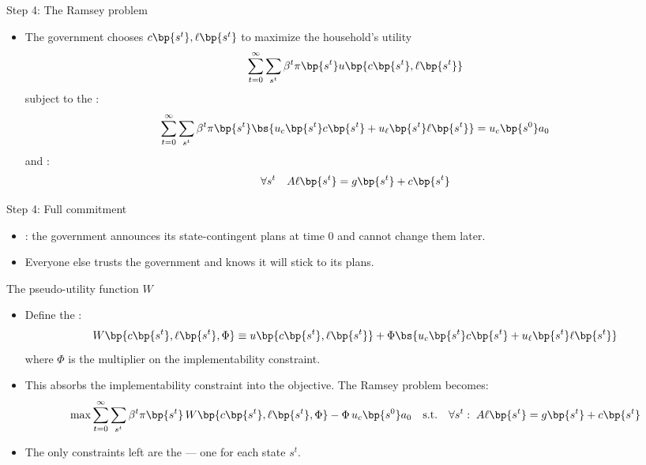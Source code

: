 \documentclass[11pt,xcolor={dvipsnames},aspectratio=159,hyperref={pdftex,pdfpagemode=UseNone,hidelinks,pdfdisplaydoctitle=true},usepdftitle=false]{beamer}
\begin{document}
            \begin{frame}{Step 4: The Ramsey problem}
            \begin{itemize}
            \item The government chooses  $c\bp{s^t},\ell\bp{s^t}$ to maximize the household's utility
            \begin{align*}
                \sum_{t=0}^\infty \sum_{s^t}  \beta^t \pi\bp{s^t} u\bp{c \bp{s^t},\ell\bp{s^t}}
            \end{align*}
            subject to the :
            \begin{align*}
                \sum_{t=0}^\infty \sum_{s^t}  \beta^t \pi\bp{s^t} \bs{  u_c \bp{s^t} c\bp{s^t}  + u_{\ell} \bp{s^t} \ell\bp{s^t}}  = u_c \bp{s^0} a_0
            \end{align*}
            and :
            \begin{align*}
            \forall s^t \quad   A \ell\bp{s^t} = g\bp{s^t} + c\bp{s^t}
            \end{align*}
            \end{itemize}
            \end{frame}
        \begin{frame}{Step 4: Full commitment}
            \begin{itemize}
            \item {}: the government announces its state-contingent plans at time 0 and cannot change them later.
            \item Everyone else trusts the government and knows it will stick to its plans.
            \end{itemize}
            \end{frame}

            \begin{frame}{The pseudo-utility function $W$}
            \begin{itemize}
            \item Define the :
            \begin{align*}
                W\bp{c\bp{s^t},\ell\bp{s^t},\Phi} \equiv u\bp{c\bp{s^t},\ell\bp{s^t}} + \Phi \bs{u_c\bp{s^t} c\bp{s^t} + u_{\ell}\bp{s^t} \ell\bp{s^t}}
            \end{align*}
            where $\Phi$ is the multiplier on the implementability constraint.
            \item This absorbs the implementability constraint into the objective. The Ramsey problem becomes:
            \begin{align*}
                \max \sum_{t=0}^\infty \sum_{s^t} \beta^t \pi\bp{s^t}\, W\bp{c\bp{s^t},\ell\bp{s^t},\Phi} - \Phi\,u_c\bp{s^0} a_0
                \quad \text{s.t.} \quad \forall s^t: \; A\ell\bp{s^t} = g\bp{s^t} + c\bp{s^t}
            \end{align*}
            \item The only constraints left are the  --- one for each state $s^t$.
            \end{itemize}
            \end{frame}
\end{document}
